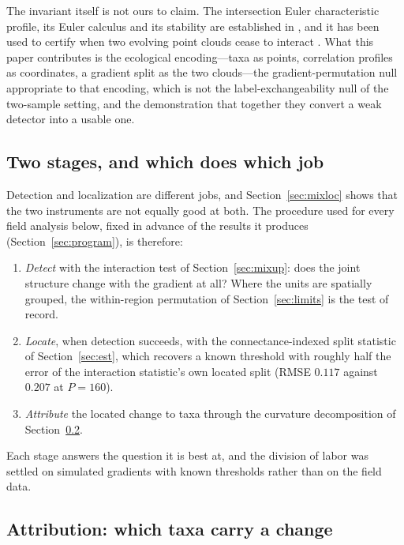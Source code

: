 \documentclass[review,12pt,authoryear]{elsarticle}
\theoremstyle{remark}
\begin{document}
The invariant itself is not ours to claim. The intersection Euler
characteristic profile, its Euler calculus and its stability are established
in \citet{kawamura2026intersection}, and it has been used to certify when two
evolving point clouds cease to interact \citep{majhi2026regime}. What this
paper contributes is the ecological encoding---taxa as points, correlation
profiles as coordinates, a gradient split as the two clouds---the
gradient-permutation null appropriate to that encoding, which is not the
label-exchangeability null of the two-sample setting, and the demonstration
that together they convert a weak detector into a usable one.

\subsection{Two stages, and which does which job}
\label{sec:twostage}

Detection and localization are different jobs, and Section~\ref{sec:mixloc}
shows that the two instruments are not equally good at both. The procedure
used for every field analysis below, fixed in advance of the results it
produces (Section~\ref{sec:program}), is therefore:

\begin{enumerate}
\item \emph{Detect} with the interaction test of Section~\ref{sec:mixup}:
does the joint structure change with the gradient at all? Where the units
are spatially grouped, the within-region permutation of
Section~\ref{sec:limits} is the test of record.
\item \emph{Locate}, when detection succeeds, with the connectance-indexed
split statistic of Section~\ref{sec:est}, which recovers a known threshold
with roughly half the error of the interaction statistic's own located
split (RMSE $0.117$ against $0.207$ at $P = 160$).
\item \emph{Attribute} the located change to taxa through the curvature
decomposition of Section~\ref{sec:curvature}.
\end{enumerate}

Each stage answers the question it is best at, and the division of labor was
settled on simulated gradients with known thresholds rather than on the
field data.

\subsection{Attribution: which taxa carry a change}
\label{sec:curvature}
\end{document}
